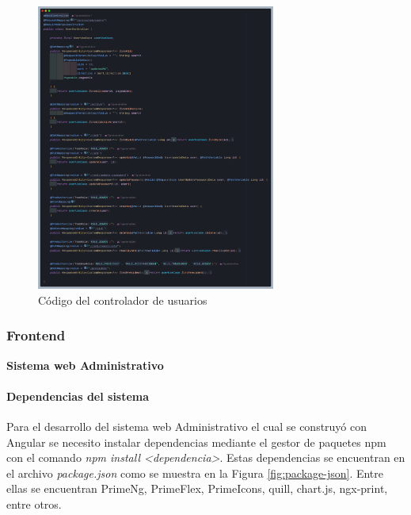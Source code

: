 \begin{figure}[H]
    \centering
    \includegraphics[width=0.7\textwidth]{resources/images/userController}
    \caption{Código del controlador de usuarios}
    \label{fig:user-controller}
\end{figure}

\subsubsection{Frontend}

\textbf{Sistema web Administrativo}
\bigbreak
\paragraph{Dependencias del sistema}

Para el desarrollo del sistema web Administrativo el cual se construyó con Angular se necesito instalar dependencias mediante el gestor de paquetes npm con el comando \textit{npm install <dependencia>}.
Estas dependencias se encuentran en el archivo \textit{package.json} como se muestra en la Figura \ref{fig:package-json}.
Entre ellas se encuentran PrimeNg, PrimeFlex, PrimeIcons, quill, chart.js, ngx-print, entre otros.

